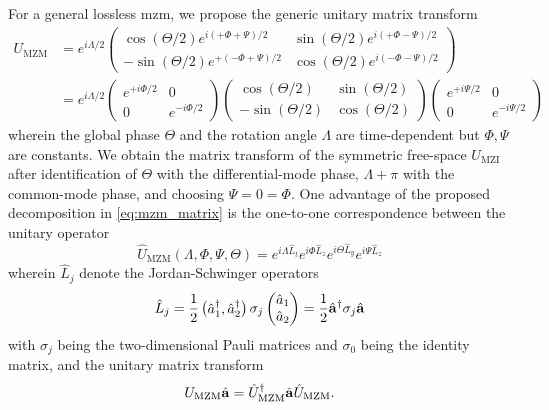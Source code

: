For a general lossless \gls{mzm}, we propose the generic unitary matrix transform~\cite[p.~95]{Leonhardt2010}
\begin{equation}
	\begin{split}
		U_\text{MZM}
		&=
		e^{i\Lambda/2}
		\begin{pmatrix}
			\cos(\Theta/2)e^{i(+\Phi+\Psi)/2} & \sin(\Theta/2)e^{i(+\Phi-\Psi)/2} \\
			-\sin(\Theta/2)e^{+(-\Phi+\Psi)/2} & \cos(\Theta/2)e^{i(-\Phi-\Psi)/2}
		\end{pmatrix}
		\\
		&=
		e^{i\Lambda/2}
		\begin{pmatrix}
			e^{+i\Phi/2} & 0 \\
			0 & e^{-i\Phi/2}
		\end{pmatrix}
		\begin{pmatrix}
			\cos(\Theta/2) & \sin(\Theta/2) \\
			-\sin(\Theta/2) & \cos(\Theta/2)
		\end{pmatrix}
		\begin{pmatrix}
			e^{+i\Psi/2} & 0 \\
			0 & e^{-i\Psi/2}
		\end{pmatrix}
	\end{split}
	\label{eq:mzm_matrix}
\end{equation}
wherein the global phase $\Theta$ and the rotation angle $\Lambda$ are time-dependent but $\Phi,\Psi$ are constants.
We obtain the matrix transform of the symmetric free-space $U_\text{MZI}$ after identification of $\Theta$ with the differential-mode phase, $\Lambda+\pi$ with the common-mode phase, and choosing $\Psi=0=\Phi$.
One advantage of the proposed decomposition in \cref{eq:mzm_matrix} is the one-to-one correspondence between the unitary operator~\cite[p.~99]{Leonhardt2010}
\begin{equation}
	\hat{U}_\text{MZM}(\Lambda,\Phi,\Psi,\Theta)
	=
	e^{i\Lambda\hat{L}_t}
	e^{i\Phi\hat{L}_z}
	e^{i\Theta\hat{L}_y}
	e^{i\Psi\hat{L}_z}
	\label{eq:mzm_operator}
\end{equation}
wherein $\hat{L}_j$ denote the Jordan-Schwinger operators~\cite[p.~97]{Leonhardt2010}
\begin{equation}
	\hat{L}_j
	=
	\frac{1}{2}
	\begin{pmatrix}
		\hat{a}_1^\dagger, \hat{a}_2^\dagger
	\end{pmatrix}
	\sigma_j
	\begin{pmatrix}
		\hat{a}_1 \\
		\hat{a}_2
	\end{pmatrix}
	=
	\frac{1}{2}
	\hat{\vb{a}}^\dagger
	\sigma_j
	\hat{\vb{a}}
\end{equation}
with $\sigma_j$ being the two-dimensional Pauli matrices and $\sigma_0$ being the identity matrix, and the unitary matrix transform
\begin{equation}
	U_\text{MZM}
	\hat{\vb{a}}
	=
	\hat{U}_\text{MZM}^\dagger
	\hat{\vb{a}}
	\hat{U}_\text{MZM}
	.
\end{equation}

